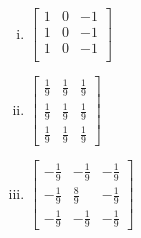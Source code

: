 \documentclass{csci1430}
\begin{document}
\begin{enumerate}[(i)]
\item
 $\begin{bmatrix}
    1 & 0 & -1 \\
    1 & 0 & -1 \\
    1 & 0 & -1 \\
 \end{bmatrix}$


\item
 $\begin{bmatrix}
    \frac{1}{9} & \frac{1}{9} & \frac{1}{9} \\
    \frac{1}{9} & \frac{1}{9} & \frac{1}{9} \\
    \frac{1}{9} & \frac{1}{9} & \frac{1}{9}
 \end{bmatrix}$


\item
$\begin{bmatrix}
    -\frac{1}{9} & -\frac{1}{9} & -\frac{1}{9} \\
    -\frac{1}{9} & \frac{8}{9} & -\frac{1}{9} \\
    -\frac{1}{9} & -\frac{1}{9} & -\frac{1}{9}
\end{bmatrix}$


\end{enumerate}
\end{document}
